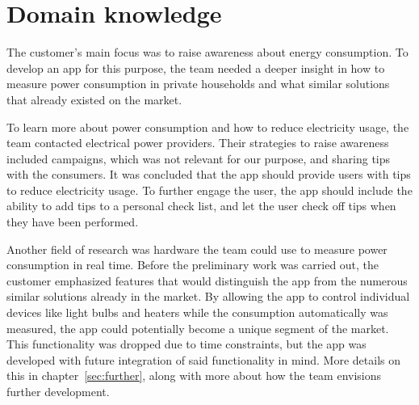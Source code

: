 \section{Domain knowledge}
The customer's main focus was to raise awareness about energy consumption. To develop an app for this purpose, the team needed a deeper insight in how to measure power consumption in private households and what similar solutions that already existed on the market.

To learn more about power consumption and how to reduce electricity usage, the team contacted electrical power providers. Their strategies to raise awareness included campaigns, which was not relevant for our purpose, and sharing tips with the consumers. It was concluded that the app should provide users with tips to reduce electricity usage. To further engage the user, the app should include the ability to add tips to a personal check list, and let the user check off tips when they have been performed.

Another field of research was hardware the team could use to measure power consumption in real time. Before the preliminary work was carried out, the customer emphasized features that would distinguish the app from the numerous similar solutions already in the market. By allowing the app to control individual devices like light bulbs and heaters while the consumption automatically was measured, the app could potentially become a unique segment of the market. This functionality was dropped due to time constraints, but the app was developed with future integration of said functionality in mind. More details on this in chapter~\ref{sec:further}, along with more about how the team envisions further development.
